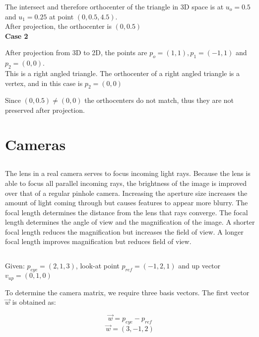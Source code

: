 \documentclass[a4paper,10pt]{scrartcl}
\begin{document}
The intersect and therefore orthocenter of the triangle in 3D space is at $u_o = 0.5$ and $u_1 = 0.25$
at point $(0, 0.5, 4.5)$.\\

After projection, the orthocenter is $(0, 0.5)$\\

{\bfseries Case 2}

After projection from 3D to 2D, the points are $p_o = (1, 1), p_1 = (-1, 1)$ and $p_2 = (0, 0)$.\\

This is a right angled triangle. The orthocenter of a right angled triangle is a vertex, and in this case is $p_2 = (0,0)$

Since $(0, 0.5) \ne (0, 0)$ the orthocenters do not match, thus they are not preserved after projection.


\section{Cameras}

\subsection{}

The lens in a real camera serves to focus incoming light rays. Because the lens is able to focus
all parallel incoming rays, the brightness of the image is improved over that of a regular pinhole camera.
Increasing the aperture size increases the amount of light coming through but causes features to appear more blurry.
The focal length determines the distance from the lens that rays converge. The focal length determines
the angle of view and the magnification of the image. A shorter focal length reduces the magnification but
increases the field of view. A longer focal length improves magnification but reduces field of view.

\subsection{}

Given: $p_{eye} = (2, 1, 3)$, look-at point $p_{ref} = (-1, 2, 1)$ and up vector $v_{up} = (0, 1, 0)$

To determine the camera matrix, we require three basis vectors. The first vector $\vec w$ is obtained
as: 

\[ \vec w = p_{eye} - p_{ref}\]
\[ \vec w = (3, -1, 2)\]
\end{document}
